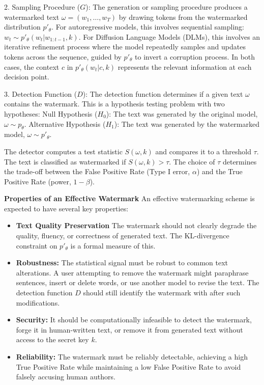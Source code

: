       2. Sampling Procedure (\(G\)): The generation or sampling procedure produces a watermarked text \(\omega = (w_1, \dots, w_T)\)
         by drawing tokens
        from the watermarked distribution \(p'_\theta\). For autoregressive models, this involves sequential sampling: \(w_t \sim
  p'_\theta(w_t |
        w_{1:t-1}, k)\). For Diffusion Language Models (DLMs), this involves an iterative refinement process where the model
  repeatedly samples and
        updates tokens across the sequence, guided by \(p'_\theta\) to invert a corruption process. In both cases, the context \(c\)
  in \(p'_\theta(w_t |
        c, k)\) represents the relevant information at each decision point.

      3. Detection Function (\(D\)): The detection function determines if a given text \(\omega\) contains the watermark. This is a
         hypothesis testing
        problem with two hypotheses:
          Null Hypothesis (\(H_0\)): The text was generated by the original model, \(\omega \sim p_\theta\).
          Alternative Hypothesis (\(H_1\)): The text was generated by the watermarked model, \(\omega \sim p'_\theta\).

        The detector computes a test statistic \(S(\omega, k)\) and compares it to a threshold \(\tau\). The text is classified as
  watermarked if
    \(S(\omega, k) > \tau\). The choice of \(\tau\) determines the trade-off between the False Positive Rate (Type I error,
  \(\alpha\)) and the True
    Positive Rate (power, \(1-\beta\)).

  \textbf{Properties of an Effective Watermark}
  An effective watermarking scheme is expected to have several key properties:
  \begin{itemize}
      \item \textbf{Text Quality Preservation} The watermark should not clearly degrade the quality, fluency, or correctness of
  generated text. The KL-divergence constraint on \(p'_\theta\) is a formal measure of this.
      \item \textbf{Robustness:} The statistical signal must be robust to common text alterations. A user attempting to remove the
  watermark might paraphrase sentences, insert or delete words, or use another model to revise the text. The detection function \(D\)
  should still identify the watermark with after such modifications.
      \item \textbf{Security:} It should be computationally infeasible to detect the watermark, forge it in human-written
  text, or remove it from generated text without access to the secret key \(k\).
      \item \textbf{Reliability:} The watermark must be reliably detectable, achieving a high True Positive Rate while maintaining a low False Positive Rate to avoid falsely accusing human authors.
  \end{itemize}


